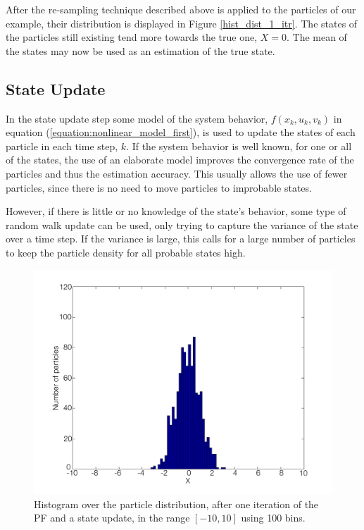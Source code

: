 \documentclass{LTHthesis}
\begin{document}
After the re-sampling technique described above is applied to the particles of our example, their distribution is displayed in Figure \ref{hist_dist_1_itr}. The states of the particles still existing tend more towards the true one, $X=0$. The mean of the states may now be used as an estimation of the true state.    
% 
\subsection{State Update}
%
In the state update step some model of the system behavior, $f(x_k,u_k,v_k)$ in equation (\ref{equation:nonlinear_model_first}), is used to update the states of each particle in each time step, $k$. If the system behavior is well known, for one or all of the states, the use  of an elaborate model improves the convergence rate of the particles and thus the estimation accuracy. This usually allows the use of fewer particles, since there is no need to move particles to improbable states.

However, if there is little or no knowledge of the state's behavior, some type of random walk update can be used, only trying to capture the variance of the state over a time step. If the variance is large, this calls for a large number of particles to keep the particle density for all probable states high. 
%
\begin{figure}[!hbt]

\includegraphics[width=1\textwidth ]{images/PF/hist_dist_1_itr_dyn}
\caption{Histogram over the particle distribution, after one iteration of the PF and a state update, in the range $[-10,10]$ using 100 bins.}\label{hist_dist_1_itr_dyn}
\end{figure}
\end{document}
